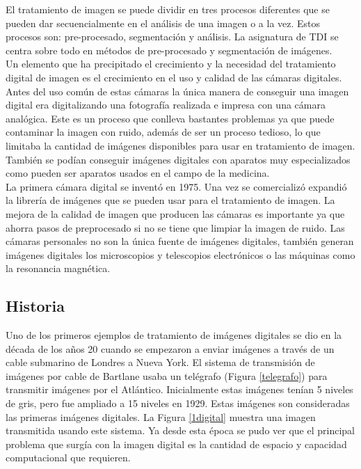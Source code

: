El tratamiento de imagen se puede dividir en tres procesos diferentes que se pueden dar secuencialmente en el análisis de una imagen o a la vez. Estos procesos son: pre-procesado, segmentación y análisis. La asignatura de TDI se centra sobre todo en métodos de pre-procesado y segmentación de imágenes.\\ 

Un elemento que ha precipitado el crecimiento y la necesidad del tratamiento digital de imagen es el crecimiento en el uso y calidad de las cámaras digitales. Antes del uso común de estas cámaras la única manera de conseguir una imagen digital era digitalizando una fotografía realizada e impresa con una cámara analógica. Este es  un proceso que conlleva bastantes problemas ya que puede contaminar la imagen con ruido, además de ser un proceso tedioso, lo que limitaba la cantidad de imágenes disponibles para usar en tratamiento de imagen. También se podían conseguir imágenes digitales con aparatos muy especializados como pueden ser aparatos usados en el campo de la medicina.\\

La primera cámara digital se inventó en 1975. Una vez se comercializó expandió la librería de imágenes que se pueden usar para el tratamiento de imagen. La mejora de la calidad de imagen que producen las cámaras es importante ya que ahorra pasos de preprocesado si no se tiene que limpiar la imagen de ruido. Las cámaras personales no son la única fuente de imágenes digitales, también generan imágenes digitales los microscopios y telescopios electrónicos o las máquinas como la resonancia magnética.\\


\subsection{Historia}
Uno de los primeros ejemplos de tratamiento de imágenes digitales se dio en la década de los años 20 cuando se empezaron a enviar imágenes a través de un cable submarino de Londres a Nueva York. El sistema de transmisión de imágenes por cable de Bartlane usaba un telégrafo (Figura \ref{telegrafo}) para transmitir imágenes por el Atlántico\cite{Historia3}. Inicialmente estas imágenes tenían 5 niveles de gris, pero fue ampliado a 15 niveles en 1929. Estas imágenes son consideradas las primeras imágenes digitales. La Figura \ref{1digital} muestra una imagen transmitida usando este sistema. Ya desde esta época se pudo ver que el principal problema que surgía con la imagen digital es la cantidad de espacio y capacidad computacional que requieren.\\

